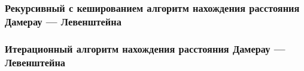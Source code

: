 
\subsubsection{Рекурсивный с кешированием алгоритм нахождения расстояния Дамерау --- Левенштейна}

\subsubsection{Итерационный алгоритм нахождения расстояния Дамерау --- Левенштейна}
